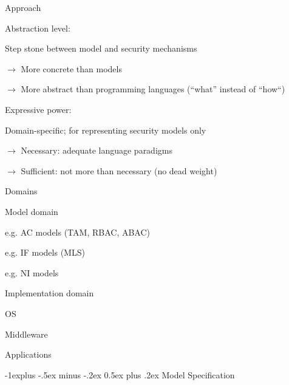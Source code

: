 \documentclass[a4paper]{article}
\makeatletter
\renewcommand{\subsection}{\@startsection{subsection}{2}{0mm}%
                                {-1explus -.5ex minus -.2ex}%
                                {0.5ex plus .2ex}%
                                {\normalfont\normalsize\bfseries}}
\makeatother
\begin{document}
\begin{multicols}{3}
    Approach
    \begin{itemize*}
        \item Abstraction level:
              \begin{itemize*}
                  \item Step stone between model and security mechanisms
                  \item $\rightarrow$  More concrete than models
                  \item $\rightarrow$  More abstract than programming languages (“what” instead of “how“)
              \end{itemize*}
        \item Expressive power:
              \begin{itemize*}
                  \item Domain-specific; for representing security models only
                  \item $\rightarrow$  Necessary: adequate language paradigms
                  \item $\rightarrow$  Sufficient: not more than necessary (no dead weight)
              \end{itemize*}
    \end{itemize*}

    Domains
    \begin{itemize*}
        \item Model domain
              \begin{itemize*}
                  \item e.g. AC models (TAM, RBAC, ABAC)
                  \item e.g. IF models (MLS)
                  \item e.g. NI models
              \end{itemize*}
        \item Implementation domain
              \begin{itemize*}
                  \item OS
                  \item Middleware
                  \item Applications
              \end{itemize*}
    \end{itemize*}


    \subsection{Model Specification }

\end{multicols}
\end{document}

